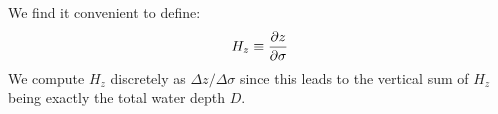 
%

We find it convenient to define:
\begin{equation}
   H_z \equiv {\partial z \over \partial \sigma}
\end{equation}
We compute $H_z$ discretely as $\Delta z/ \Delta
\sigma$ since this leads to the vertical sum of $H_z$ being exactly the
total water depth $D$.


